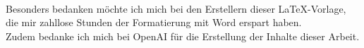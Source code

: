 \vspace*{\fill}
\begin{center}
  \begin{minipage}{.8\textwidth}
    \centering
    \textbf{}\\[1em]
    Besonders bedanken möchte ich mich bei den Erstellern dieser \LaTeX -Vorlage, die mir zahllose Stunden der Formatierung mit Word erspart haben.\\[1em]
    Zudem bedanke ich mich bei OpenAI für die Erstellung der Inhalte dieser Arbeit.
  \end{minipage}
\end{center}
\vspace*{\fill}
